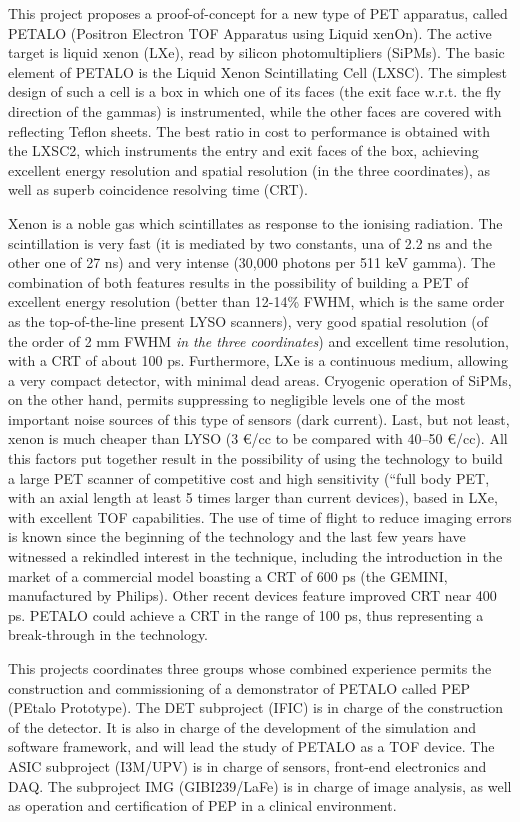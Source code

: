 This project proposes a proof-of-concept for a new type of PET apparatus, called
PETALO (Positron Electron TOF Apparatus using Liquid xenOn). The active target is liquid xenon (LXe), read by silicon photomultipliers (SiPMs). The basic element of PETALO is the Liquid Xenon Scintillating Cell (LXSC). The simplest design of such a cell is a box in which one of its faces (the exit face w.r.t. the fly direction of the gammas) is instrumented, while the other faces are covered with reflecting Teflon sheets. The best ratio in cost to performance is obtained with the LXSC2, which instruments  the entry and exit faces of the box, achieving excellent energy resolution and spatial resolution (in the three coordinates), as well as superb coincidence resolving time (CRT).  

Xenon is a noble gas which scintillates as response to the ionising radiation. The scintillation is very fast (it is mediated by two constants, una of 2.2 ns and the other one of 27 ns) and very intense (30,000 photons per 511 keV gamma). The combination of both features results in the possibility of building a PET of excellent energy resolution (better than 12-14\% FWHM, which is the same order as the top-of-the-line present LYSO scanners), very good spatial resolution
(of the order of 2 mm FWHM {\em in the three coordinates})  and excellent time resolution, with a CRT of about 100 ps. Furthermore, LXe is a continuous medium, allowing a very compact detector, with minimal dead areas. Cryogenic operation of SiPMs, on the other hand, permits suppressing to negligible levels one of the most important noise sources of this type of sensors (dark current). Last, but not least, xenon is much cheaper than LYSO (3 \euro/cc to be compared with 40--50 \euro/cc). All this factors put together result in the possibility of using the technology to build a large PET scanner of competitive cost and high sensitivity (``full body PET, with an axial length at least 5 times larger than current devices), based in LXe, with excellent TOF capabilities. The use of time of flight to reduce imaging errors is known since the beginning of the technology and the last few years have witnessed a rekindled interest in the technique, including the introduction in the market of a commercial model boasting a CRT of 600 ps (the GEMINI, manufactured by Philips). Other recent devices feature improved CRT near 400 ps. PETALO could achieve a CRT in the range of 100 ps, thus representing a break-through in the technology.  

This projects coordinates three groups whose combined experience permits the construction and commissioning of a demonstrator of PETALO called PEP (PEtalo Prototype). The DET subproject (IFIC) is in charge of the construction  of the detector. It is also in charge of the development of the simulation and software framework, and will lead the study of PETALO as a TOF device. The ASIC subproject (I3M/UPV) is in charge of sensors, front-end electronics and DAQ. The subproject IMG 
(GIBI239/LaFe) is in charge of image analysis, as well as operation and certification of PEP in a clinical environment.   



